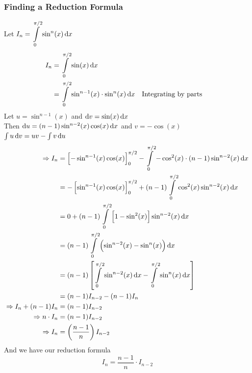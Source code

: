 \documentclass[14]{article}
\theoremstyle{definition}
\theoremstyle{case}
\begin{document}
\subsubsection*{Finding a Reduction Formula}
Let $I_n = \displaystyle\int\limits_0^{\pi/2} \sin^n(x) \dif x$
\begin{align*}
I_n &= \displaystyle\int\limits_0^{\pi/2} \sin(x) \dif x\\
&= \displaystyle \int\limits_0^{\pi/2} \sin^{n-1}(x) \cdot\sin^n(x) \dif x && \text{Integrating by parts}
\end{align*}
Let $u = \sin^{n-1}(x)$ and $\dif v = \sin(x) \dif x$\\
Then $\dif u = (n-1) \sin^{n-2}(x) \cos(x) \dif x$ and $ v = -\cos(x)$\\
$\int u \dif v = uv - \int v \dif u$
\begin{align*}
\Rightarrow I_n &= \left[ -\sin^{n-1}(x) \cos(x) \right]_0^{\pi/2} - \int\limits_0^{\pi/2} -\cos^2(x) \cdot (n-1) \sin^{n-2}(x) \dif x\\
&=-\left[ \sin^{n-1}(x) \cos(x) \right]_0^{\pi/2} + (n-1) \int\limits_0^{\pi/2} \cos^2(x) \sin^{n-2}(x) \dif x\\
&= 0 + (n-1) \int\limits_0^{\pi/2} \left[ 1 - \sin^2(x) \right] \sin^{n-2}(x) \dif x\\
&= (n-1) \int\limits_0^{\pi/2} \left( \sin^{n-2}(x) - \sin^n(x) \right) \dif x\\
&= (n-1)\left[ \int\limits_0^{\pi/2} \sin^{n-2}(x) \dif x - \int\limits_0^{\pi/2} \sin^n(x) \dif x\right]\\
&= (n-1) I_{n-2} - (n-1)I_n \\
\Rightarrow I_n + (n-1)I_n &= (n-1)I_{n-2}\\
\Rightarrow n \cdot I_n &= (n-1) I_{n-2}\\
\Rightarrow I_n &= \left(\dfrac{n-1}{n}\right) I_{n-2}\\
\end{align*}
And we have our reduction formula
\[I_n = \dfrac{n-1}{n} \cdot I_{n-2}\]
\pagebreak
\end{document}
